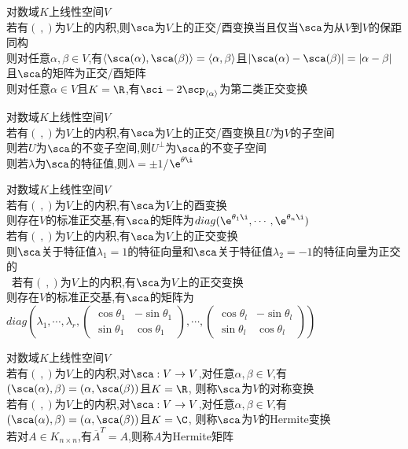 \begin{dingli}
对数域$K$上线性空间$V$\\
若有$(\ ,)$为$V$上的内积,则$\sca$为$V$上的正交/酉变换当且仅当$\sca$为从$V$到$V$的保距同构\\
则对任意$\alpha,\beta\in V$,有$\langle\sca(\alpha),\sca(\beta)\rangle=\langle\alpha,\beta\rangle$且$|\sca(\alpha)-\sca(\beta)|=|\alpha-\beta|$且$\sca$的矩阵为正交/酉矩阵\\
则对任意$\alpha\in V$且$K=\R$,有$\sci-2\scp_{\langle\alpha\rangle}$为第二类正交变换
\end{dingli}

\begin{dingli}
对数域$K$上线性空间$V$\\
若有$(\ ,)$为$V$上的内积,有$\sca$为$V$上的正交/酉变换且$U$为$V$的子空间\\
则若$U$为$\sca$的不变子空间,则$U^{\perp}$为$\sca$的不变子空间\\
则若$\lambda$为$\sca$的特征值,则$\lambda=\pm1$/$\e^{\theta\i}$
\end{dingli}

\begin{dingli}
对数域$K$上线性空间$V$\\
若有$(\ ,)$为$V$上的内积,有$\sca$为$V$上的酉变换\\
则存在$V$的标准正交基,有$\sca$的矩阵为$diag(\e^{\theta_1\i},\cdots,\e^{\theta_n\i})$\\
若有$(\ ,)$为$V$上的内积,有$\sca$为$V$上的正交变换\\
则$\sca$关于特征值$\lambda_1=1$的特征向量和$\sca$关于特征值$\lambda_2=-1$的特征向量为正交的\\\
若有$(\ ,)$为$V$上的内积,有$\sca$为$V$上的正交变换\\
则存在$V$的标准正交基,有$\sca$的矩阵为$diag(\lambda_1,\cdots,\lambda_r,\begin{pmatrix}\cos\theta_1&-\sin\theta_1\\ \sin\theta_1&\cos\theta_1\end{pmatrix},\cdots,\begin{pmatrix}\cos\theta_l&-\sin\theta_l\\ \sin\theta_l&\cos\theta_l\end{pmatrix})$
\end{dingli}

\begin{dingyi}
对数域$K$上线性空间$V$\\
若有$(\ ,)$为$V$上的内积,对$\sca:V\to V$,对任意$\alpha,\beta\in V$,有$(\sca(\alpha),\beta)=(\alpha,\sca(\beta))$且$K=\R$,
则称$\sca$为$V$的对称变换\\
若有$(\ ,)$为$V$上的内积,对$\sca:V\to V$,对任意$\alpha,\beta\in V$,有$(\sca(\alpha),\beta)=(\alpha,\sca(\beta))$且$K=\C$,
则称$\sca$为$V$的Hermite变换\\
若对$A\in K_{n\times n}$,有$\overline{A}^{T}=A$,则称$A$为Hermite矩阵
\end{dingyi}

